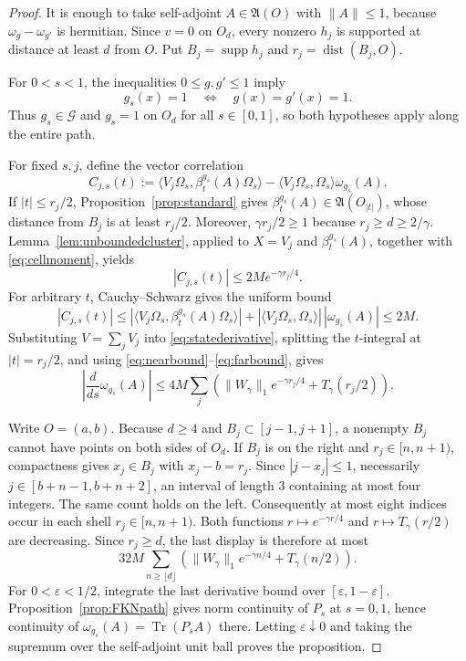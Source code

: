 \documentclass[11pt,a4paper]{article}
\theoremstyle{remark}
\newcommand{\A}{\mathfrak A}
\newcommand{\G}{\mathcal G}
\newcommand{\Om}{\Omega}
\DeclareMathOperator{\supp}{supp}
\DeclareMathOperator{\dist}{dist}
\begin{document}
\begin{proof}
It is enough to take self-adjoint $A\in\A(O)$ with $\|A\|\le1$, because
$\omega_g-\omega_{g'}$ is hermitian.  Since $v=0$ on $O_d$, every nonzero $h_j$ is supported at
distance at least $d$ from $O$.  Put $B_j=\supp h_j$ and $r_j=\dist(B_j,O)$.

For $0<s<1$, the inequalities $0\le g,g'\le1$ imply
\[
 g_s(x)=1\quad\Longleftrightarrow\quad g(x)=g'(x)=1.
\]
Thus $g_s\in\G$ and $g_s=1$ on $O_d$ for all $s\in[0,1]$, so both hypotheses apply along the
entire path.

For fixed $s,j$, define the vector correlation
\[
 C_{j,s}(t):=
 \langle V_j\Om_s,\beta_t^{g_s}(A)\Om_s\rangle
 -\langle V_j\Om_s,\Om_s\rangle\omega_{g_s}(A).
\]
If $|t|\le r_j/2$, Proposition~\ref{prop:standard} gives
$\beta_t^{g_s}(A)\in\A(O_{|t|})$, whose distance from $B_j$ is at least $r_j/2$.  Moreover,
$\gamma r_j/2\ge1$ because $r_j\ge d\ge2/\gamma$.  Lemma~\ref{lem:unboundedcluster}, applied to
$X=V_j$ and
$\beta_t^{g_s}(A)$, together with \eqref{eq:cellmoment}, yields
\begin{equation}\label{eq:nearbound}
 |C_{j,s}(t)|\le2M e^{-\gamma r_j/4}.
\end{equation}
For arbitrary $t$, Cauchy--Schwarz gives the uniform bound
\begin{equation}\label{eq:farbound}
 |C_{j,s}(t)|
 \le |\langle V_j\Om_s,\beta_t^{g_s}(A)\Om_s\rangle|
     +|\langle V_j\Om_s,\Om_s\rangle|\,|\omega_{g_s}(A)|
 \le2M.
\end{equation}
Substituting $V=\sum_jV_j$ into \eqref{eq:statederivative}, splitting the $t$-integral at
$|t|=r_j/2$, and using \eqref{eq:nearbound}--\eqref{eq:farbound}, gives
\[
 \left|\frac d{ds}\omega_{g_s}(A)\right|
 \le4M\sum_j
 \left(\|W_\gamma\|_1e^{-\gamma r_j/4}+T_\gamma(r_j/2)\right).
\]

Write $O=(a,b)$.  Because $d\ge4$ and $B_j\subset[j-1,j+1]$, a nonempty $B_j$ cannot have points
on both sides of $O_d$.  If $B_j$ is on the right and $r_j\in[n,n+1)$, compactness gives
$x_j\in B_j$ with $x_j-b=r_j$.  Since $|j-x_j|\le1$, necessarily
$j\in[b+n-1,b+n+2]$, an interval of length $3$ containing at most four integers.  The same count
holds on the left.  Consequently at most eight indices occur in each shell
$r_j\in[n,n+1)$.  Both functions
$r\mapsto e^{-\gamma r/4}$ and $r\mapsto T_\gamma(r/2)$ are decreasing.  Since $r_j\ge d$, the
last display is therefore at most
\[
 32M\sum_{n\ge\lfloor d\rfloor}
 \left(\|W_\gamma\|_1e^{-\gamma n/4}+T_\gamma(n/2)\right).
\]
For $0<\varepsilon<1/2$, integrate the last derivative bound over
$[\varepsilon,1-\varepsilon]$.  Proposition~\ref{prop:FKNpath} gives norm continuity of $P_s$ at
$s=0,1$, hence continuity of $\omega_{g_s}(A)=\operatorname{Tr}(P_sA)$ there.  Letting
$\varepsilon\downarrow0$ and taking the supremum over the self-adjoint unit ball proves the
proposition.
\end{proof}
\end{document}
